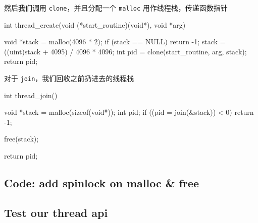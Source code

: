 然后我们调用 \texttt{clone}，并且分配一个 \texttt{malloc} 用作线程栈，传递函数指针

\begin{ccode}
	int
	thread_create(void (*start_routine)(void*), void *arg) 
	{
				  
		void *stack = malloc(4096 * 2);
		if (stack == NULL) return -1;
		stack = ((uint)stack + 4095) / 4096 * 4096;
		int pid = clone(start_routine, arg, stack);
		return pid;
	}
\end{ccode}

对于 \texttt{join}，我们回收之前扔进去的线程栈

\begin{ccode}
	int
	thread_join()
	{
		void *stack = malloc(sizeof(void*));
		int pid;
		if ((pid = join(&stack)) < 0) return -1;
		
		free(stack);
		
		return pid;
	}
\end{ccode}



\subsection{Code: add spinlock on malloc \& free}



\subsection{Test our thread api}